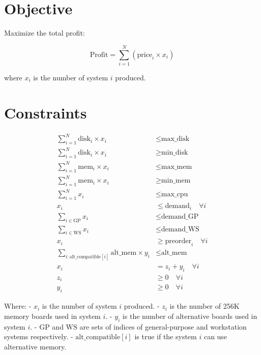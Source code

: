 \documentclass{article}
\begin{document}
\section*{Objective}

Maximize the total profit:

\[
\text{Profit} = \sum_{i=1}^{N} \left( \text{price}_i \times x_i \right)
\]

where \(x_i\) is the number of system \(i\) produced.

\section*{Constraints}

\begin{align}
    \sum_{i=1}^{N} \text{disk}_i \times x_i &\leq \text{max\_disk} \label{eq:disk_max_avail} \\
    \sum_{i=1}^{N} \text{disk}_i \times x_i &\geq \text{min\_disk} \label{eq:disk_min_avail} \\
    \sum_{i=1}^{N} \text{mem}_i \times x_i &\leq \text{max\_mem} \label{eq:mem_max_avail} \\
    \sum_{i=1}^{N} \text{mem}_i \times x_i &\geq \text{min\_mem} \label{eq:mem_min_avail} \\
    \sum_{i=1}^{N} x_i &\leq \text{max\_cpu} \label{eq:cpu_max_avail} \\
    x_i &\leq \text{demand}_i \quad \forall i \label{eq:demand_individual} \\
    \sum_{i \in \text{GP}} x_i &\leq \text{demand\_GP} \label{eq:demand_GP} \\
    \sum_{i \in \text{WS}} x_i &\leq \text{demand\_WS} \label{eq:demand_WS} \\
    x_i &\geq \text{preorder}_i \quad \forall i \label{eq:preorders} \\
    \sum_{i: \text{alt\_compatible}[i]} \text{alt\_mem} \times y_i &\leq \text{alt\_mem} \label{eq:alt_mem_avail} \\
    x_i &= z_i + y_i \quad \forall i \label{eq:mem_type_split} \\
    z_i &\geq 0 \quad \forall i \label{eq:256K_mem_nonneg} \\
    y_i &\geq 0 \quad \forall i \label{eq:alt_mem_nonneg}
\end{align}

Where:
- \(x_i\) is the number of system \(i\) produced.
- \(z_i\) is the number of 256K memory boards used in system \(i\).
- \(y_i\) is the number of alternative boards used in system \(i\).
- \(\text{GP}\) and \(\text{WS}\) are sets of indices of general-purpose and workstation systems respectively.
- \(\text{alt\_compatible}[i]\) is true if the system \(i\) can use alternative memory.
\end{document}
